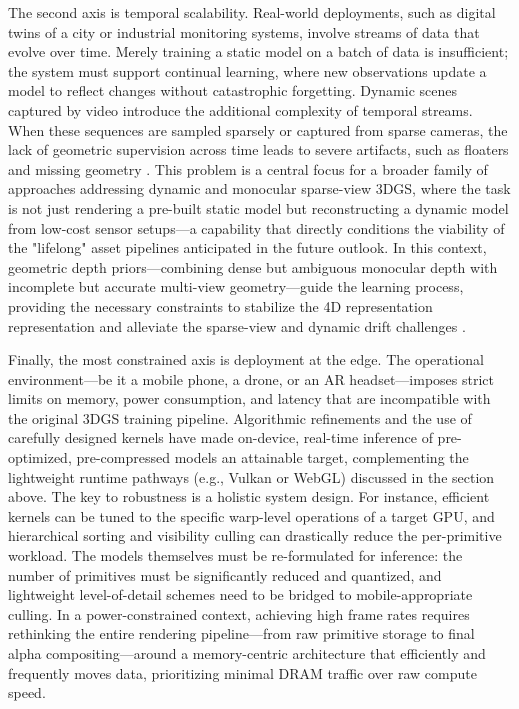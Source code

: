 \documentclass[11pt,a4paper]{article}
\begin{document}
The second axis is temporal scalability. Real-world deployments, such as digital twins of a city or industrial monitoring systems, involve streams of data that evolve over time. Merely training a static model on a batch of data is insufficient; the system must support continual learning, where new observations update a model to reflect changes without catastrophic forgetting. Dynamic scenes captured by video introduce the additional complexity of temporal streams. When these sequences are sampled sparsely or captured from sparse cameras, the lack of geometric supervision across time leads to severe artifacts, such as floaters and missing geometry \cite{arxiv:2608.01588v1}. This problem is a central focus for a broader family of approaches addressing dynamic and monocular sparse-view 3DGS, where the task is not just rendering a pre-built static model but reconstructing a dynamic model from low-cost sensor setups---a capability that directly conditions the viability of the "lifelong" asset pipelines anticipated in the future outlook. In this context, geometric depth priors---combining dense but ambiguous monocular depth with incomplete but accurate multi-view geometry---guide the learning process, providing the necessary constraints to stabilize the 4D representation representation and alleviate the sparse-view and dynamic drift challenges \cite{arxiv:2608.01588v1}.

Finally, the most constrained axis is deployment at the edge. The operational environment---be it a mobile phone, a drone, or an AR headset---imposes strict limits on memory, power consumption, and latency that are incompatible with the original 3DGS training pipeline. Algorithmic refinements and the use of carefully designed kernels have made on-device, real-time inference of pre-optimized, pre-compressed models an attainable target, complementing the lightweight runtime pathways (e.g., Vulkan or WebGL) discussed in the section above. The key to robustness is a holistic system design. For instance, efficient kernels can be tuned to the specific warp-level operations of a target GPU, and hierarchical sorting and visibility culling can drastically reduce the per-primitive workload. The models themselves must be re-formulated for inference: the number of primitives must be significantly reduced and quantized, and lightweight level-of-detail schemes need to be bridged to mobile-appropriate culling. In a power-constrained context, achieving high frame rates requires rethinking the entire rendering pipeline---from raw primitive storage to final alpha compositing---around a memory-centric architecture that efficiently and frequently moves data, prioritizing minimal DRAM traffic over raw compute speed.
\end{document}
